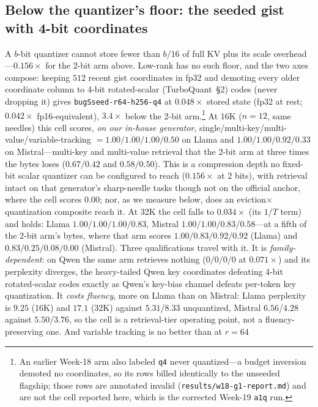 \documentclass[11pt]{article}
\begin{document}
\subsection{Below the quantizer's floor: the seeded gist with 4-bit coordinates}
\label{sec:subcliff}
A $b$-bit quantizer cannot store fewer than $b/16$ of full KV plus its scale
overhead---$0.156\times$ for the 2-bit arm above. Low-rank has no such floor,
and the two axes compose: keeping $512$ recent gist coordinates in fp32 and
demoting every older coordinate column to 4-bit rotated-scalar (TurboQuant~\S2)
codes (never
dropping it) gives \texttt{bugSseed-r64-h256-q4} at \textbf{$0.048\times$}
stored state (fp32 at rest; $0.042\times$ fp16-equivalent), $3.4\times$ below
the 2-bit arm.\footnote{An earlier Week-18 arm also labeled \texttt{q4} never
quantized---a budget inversion demoted no coordinates, so its rows billed
identically to the unseeded flagship; those rows are annotated invalid
(\texttt{results/w18-g1-report.md}) and are not the cell reported here, which is
the corrected Week-19 \texttt{a1q} run.} At 16K ($n{=}12$, same needles) this cell scores, \emph{on our in-house
generator}, single/multi-key/multi-value/variable-tracking $= 1.00/1.00/1.00/0.50$
on Llama and $1.00/1.00/0.92/0.33$ on Mistral---multi-key and multi-value retrieval
that the 2-bit arm at three times the bytes loses ($0.67/0.42$ and $0.58/0.50$).
This is a compression depth no fixed-bit scalar quantizer can be configured to
reach ($0.156\times$ at 2 bits), with retrieval intact on that generator's
sharp-needle tasks though not on the official anchor, where the cell scores $0.00$;
nor, as we measure below, does an eviction$\times$quantization composite reach it.
At 32K the cell falls to
$0.034\times$ (its $1/T$ term) and holds: Llama $1.00/1.00/1.00/0.83$, Mistral
$1.00/1.00/0.83/0.58$---at a fifth of the 2-bit arm's bytes, where that arm
scores $1.00/0.83/0.92/0.92$ (Llama) and $0.83/0.25/0.08/0.00$ (Mistral). Three
qualifications travel with it. It is \emph{family-dependent}: on Qwen the same
arm retrieves nothing ($0/0/0/0$ at $0.071\times$) and its perplexity diverges,
the heavy-tailed Qwen key coordinates defeating 4-bit rotated-scalar codes exactly as
Qwen's key-bias channel defeats per-token key quantization. It \emph{costs
fluency}, more on Llama than on Mistral: Llama perplexity is $9.25$ (16K) and
$17.1$ (32K) against $5.31$/$8.33$ unquantized, Mistral $6.56$/$4.28$ against
$5.50$/$3.76$, so the cell is a retrieval-tier operating point, not a
fluency-preserving one. And variable tracking is no better than at $r{=}64$
\end{document}
